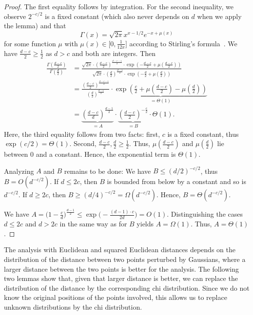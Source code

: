 \documentclass[11pt,DIV=12,a4paper]{scrartcl}
\begin{document}
\begin{proof}
The first equality follows by integration. For the second inequality, we observe $2^{-c/2}$ is a fixed constant (which also never depends on $d$
when we apply the lemma) and that
\[
  \Gamma(x) = \sqrt{2\pi} x^{x-1/2} e^{-x + \mu(x)}
\]
for some function $\mu$ with $\mu(x) \in \bigl[0, \frac 1{12x}\bigr]$ according to Stirling's formula~\cite[6.1.37]{Abramowitz:Pocket:1984}.
We have $\frac{d-c}2 \geq \frac 12$ as $d > c$ and both are integers.
Then
\begin{align*}
\frac{\Gamma(\frac{d-c}2)}{\Gamma(\frac d2)}
& = \frac{\sqrt{2\pi} \cdot \left(\frac{d-c}2\right)^{\frac{d-c-1}{2}} \cdot 
   \exp\left(-\frac{d-c}2 + \mu\left(\frac{d-c}2\right)\right)}{\sqrt{2\pi}
      \cdot \left(\frac d2\right)^{\frac{d-1}2} \cdot \exp\left(-\frac d2 + \mu\left(\frac d2\right)\right)} \\
& = \frac{\left(\frac{d-c}2\right)^{\frac{d-c-1}{2}}}{\left(\frac d2\right)^{\frac{d-1}2}} 
\cdot \underbrace{\exp\left(\frac{c}2 + \mu\left(\frac{d-c}2\right) - \mu\left(\frac d2\right)\right)}_{=\Theta(1)} \\
& = \underbrace{\left(\frac{d-c}d\right)^{\frac{d-1}2}}_{=A} \cdot \underbrace{\left(\frac{d-c}2\right)^{-\frac c2}}_{=B}
\cdot \Theta(1).
\end{align*}
Here, the third equality follows from two facts: first, $c$ is a fixed constant, thus $\exp(c/2) = \Theta(1)$. Second, $\frac{d-c}2, \frac d2 \geq \frac 12$.
Thus, $\mu(\frac{d-c}2)$ and $\mu(\frac d2)$ lie between $0$ and a constant. Hence, the exponential term is $\Theta(1)$.

Analyzing $A$ and $B$ remains to be done: We have $B \leq (d/2)^{-c/2}$, thus $B = O(d^{-c/2})$.
If $d \leq 2c$, then $B$ is bounded from below by a constant and so is $d^{-c/2}$. If $d \geq 2c$,
then $B \geq (d/4)^{-c/2} = \Omega(d^{-c/2})$. Hence, $B = \Theta(d^{-c/2})$.

We have $A = \bigl(1 - \frac cd\bigr)^{\frac{d-1}2} \leq \exp\bigl(-\frac{(d-1)\cdot c}{2d}\bigr) = O(1)$.
Distinguishing the cases $d \leq 2c$ and $d > 2c$ in the same way as for $B$ yields $A = \Omega(1)$. Thus, $A = \Theta(1)$.
\end{proof}


The analysis with Euclidean and squared Euclidean distances depends on the distribution of the distance between two points perturbed by Gaussians,
where a larger distance between the two points is better for the analysis.
The following two lemmas show that, given that larger distance is better, we can replace the distribution of the distance by the corresponding
chi distribution. Since we do not know the original positions of the points involved, this allows us to replace unknown distributions by the
chi distribution.
\end{document}
